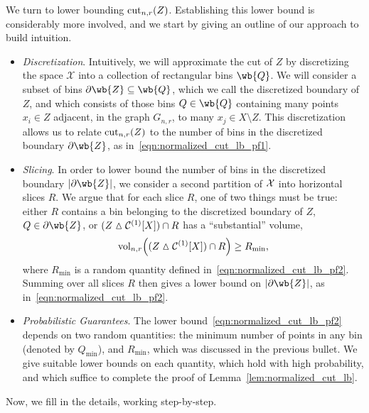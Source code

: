 	We turn to lower bounding $\mathrm{cut}_{n,r}(Z)$. Establishing this lower bound is considerably more involved, and we start by giving an outline of our approach to build intuition.
	\begin{itemize}
		\item \emph{Discretization}. Intuitively, we will approximate the cut of $Z$ by discretizing the space $\mathcal{X}$ into a collection of rectangular bins $\wb{Q}$. We will consider a subset of bins $\partial \wb{Z} \subseteq \wb{Q}$, which we call the discretized boundary of $Z$, and which consists of those bins $Q \in \wb{Q}$ containing many points $x_i \in Z$ adjacent, in the graph $G_{n,r}$, to many $x_j \in X \setminus Z$. This discretization allows us to relate $\mathrm{cut}_{n,r}(Z)$ to the number of bins in the discretized boundary $\partial \wb{Z}$, as in~\eqref{eqn:normalized_cut_lb_pf1}.
		\item \emph{Slicing}. In order to lower bound the number of bins in the discretized boundary $|\partial \wb{Z}|$, we consider a second partition of $\mathcal{X}$ into horizontal slices $R$. We argue that for each slice $R$, one of two things must be true: either $R$ contains a bin belonging to the discretized boundary of $Z$, $Q \in \partial \wb{Z}$, or $(Z \vartriangle \mathcal{C}^{(1)}[X]) \cap R$ has a ``substantial'' volume,
		\begin{equation*}
		\mathrm{vol}_{n,r}\Bigl((Z \vartriangle \mathcal{C}^{(1)}[X]) \cap R\Bigr) \geq R_{\min},
		\end{equation*}
		where $R_{\min}$ is a random quantity defined in~\eqref{eqn:normalized_cut_lb_pf2}.
		Summing over all slices $R$ then gives a lower bound on $|\partial \wb{Z}|$, as in~\eqref{eqn:normalized_cut_lb_pf2}. 
		\item \emph{Probabilistic Guarantees}. The lower bound~\eqref{eqn:normalized_cut_lb_pf2} depends on two random quantities: the minimum number of points in any bin (denoted by $Q_{\min}$), and $R_{\min}$, which was discussed in the previous bullet. We give suitable lower bounds on each quantity, which hold with high probability, and which suffice to complete the proof of Lemma~\ref{lem:normalized_cut_lb}.
	\end{itemize}
	
	Now, we fill in the details, working step-by-step.
	
